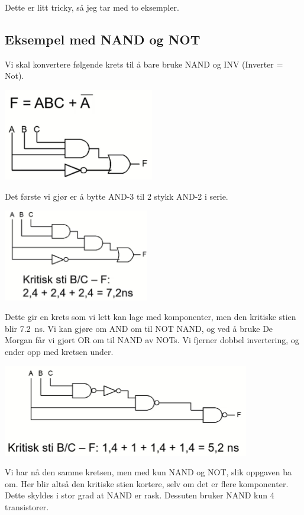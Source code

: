\documentclass[12pt,a4paper,norsk]{article}
\begin{document}
Dette er litt tricky, så jeg tar med to eksempler.

\subsection{Eksempel med NAND og NOT}
Vi skal konvertere følgende krets til å bare bruke NAND og INV (Inverter = Not).
\begin{center}
  \includegraphics[height=4cm,keepaspectratio]{Krets_BeforeTeknomap}
\end{center}
Det første vi gjør er å bytte AND-3 til 2 stykk AND-2 i serie.
\begin{center}
  \includegraphics[height=4cm,keepaspectratio]{Krets_DuringTeknomap}
\end{center}
Dette gir en krets som vi lett kan lage med komponenter, men den kritiske stien blir
\SI{7.2}{\nano\second}. Vi kan gjøre om AND om til NOT NAND, og ved å bruke De
Morgan får vi gjort OR om til NAND av NOTs. Vi fjerner dobbel invertering, og
ender opp med kretsen under.
\begin{center}
  \includegraphics[height=4cm,keepaspectratio]{Krets_AfterTeknomap}
\end{center}
Vi har nå den samme kretsen, men med kun NAND og NOT, slik oppgaven ba om. Her
blir altså den kritiske stien kortere, selv om det er flere komponenter. Dette
skyldes i stor grad at NAND er rask. Dessuten bruker NAND kun 4 transistorer.
\end{document}
